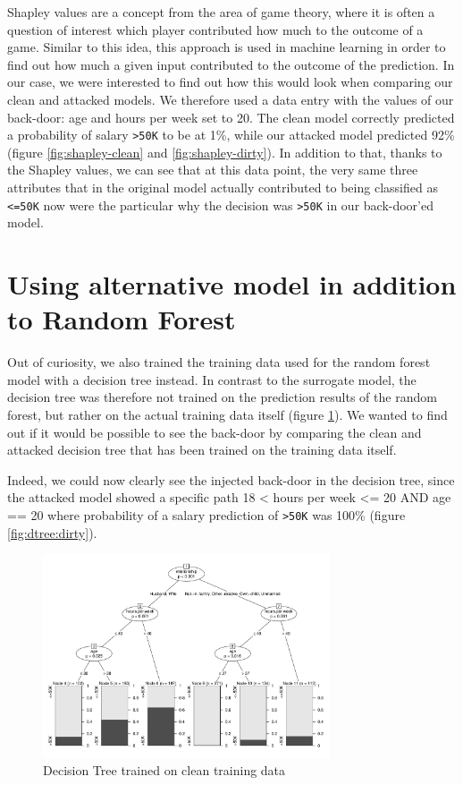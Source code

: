 \documentclass[sigconf,nonacm]{acmart}
\begin{document}
Shapley values are a concept from the area of game theory, where it is
often a question of interest which player contributed how much to the
outcome of a game. Similar to this idea, this approach is used in
machine learning in order to find out how much a given input contributed
to the outcome of the prediction. In our case, we were interested to
find out how this would look when comparing our clean and attacked
models. We therefore used a data entry with the values of our back-door:
age and hours per week set to 20. The clean model correctly predicted a
probability of salary \texttt{\textgreater{}50K} to be at 1\%, while our
attacked model predicted 92\% (figure \ref{fig:shapley-clean} and
\ref{fig:shapley-dirty}). In addition to that, thanks to the Shapley
values, we can see that at this data point, the very same three
attributes that in the original model actually contributed to being
classified as \texttt{\textless{}=50K} now were the particular why the
decision was \texttt{\textgreater{}50K} in our back-door'ed model.

\hypertarget{using-alternative-model-in-addition-to-random-forest}{%
\section{Using alternative model in addition to Random
Forest}\label{using-alternative-model-in-addition-to-random-forest}}

Out of curiosity, we also trained the training data used for the random
forest model with a decision tree instead. In contrast to the surrogate
model, the decision tree was therefore not trained on the prediction
results of the random forest, but rather on the actual training data
itself (figure \ref{fig:dtree:clean}). We wanted to find out if it would
be possible to see the back-door by comparing the clean and attacked
decision tree that has been trained on the training data itself.

Indeed, we could now clearly see the injected back-door in the decision
tree, since the attacked model showed a specific path 18 \textless{}
hours per week \textless= 20 AND age == 20 where probability of a salary
prediction of \texttt{\textgreater{}50K} was 100\% (figure
\ref{fig:dtree:dirty}).

\begin{figure}
    \includegraphics[width=8.5cm]{decisionTreeClean.pdf}
    \caption{Decision Tree trained on clean training data}
    \label{fig:dtree:clean}
\end{figure}
\end{document}
